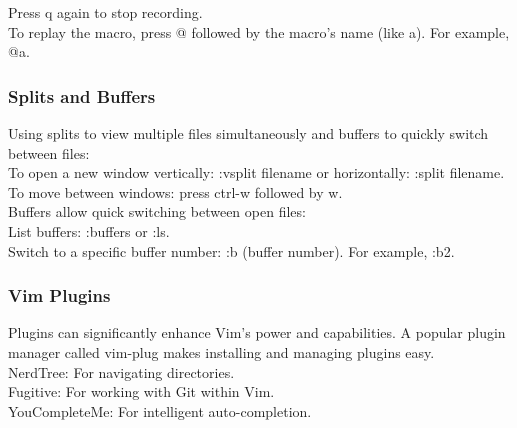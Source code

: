 \documentclass{article}
\begin{document}
Press q again to stop recording.\\

To replay the macro, press @ followed by the macro's name (like a). For example, @a.\\

\subsubsection{Splits and Buffers}
Using splits to view multiple files simultaneously and buffers to quickly switch between files:\\

To open a new window vertically: :vsplit filename or horizontally: :split filename.\\

To move between windows: press ctrl-w followed by w.\\

Buffers allow quick switching between open files:\\

List buffers: :buffers or :ls.\\

Switch to a specific buffer number: :b (buffer number). For example, :b2.\\

\subsubsection{Vim Plugins}
Plugins can significantly enhance Vim's power and capabilities. A popular plugin manager called vim-plug makes installing and managing plugins easy.\\

NerdTree: For navigating directories.\\

Fugitive: For working with Git within Vim.\\

YouCompleteMe: For intelligent auto-completion.\\
\end{document}
